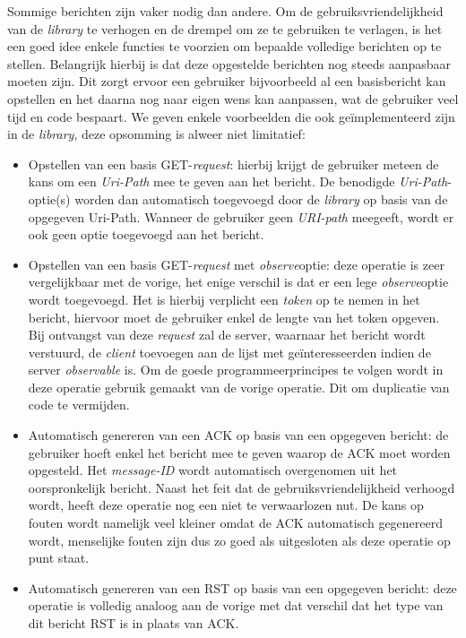Sommige berichten zijn vaker nodig dan andere. Om de gebruiksvriendelijkheid van de \textit{library} te verhogen en de drempel om ze te gebruiken te verlagen, is het een goed idee enkele functies te voorzien om bepaalde volledige berichten op te stellen. Belangrijk hierbij is dat deze opgestelde berichten nog steeds aanpasbaar moeten zijn. Dit zorgt ervoor een gebruiker bijvoorbeeld al een basisbericht kan opstellen en het daarna nog naar eigen wens kan aanpassen, wat de gebruiker veel tijd en code bespaart. We geven enkele voorbeelden die ook ge\"{i}mplementeerd zijn in de \textit{library}, deze opsomming is alweer niet limitatief:
\begin{itemize}
\item Opstellen van een basis GET-\textit{request}: hierbij krijgt de gebruiker meteen de kans om een \textit{Uri-Path} mee te geven aan het bericht. De benodigde \textit{Uri-Path}-optie(s) worden dan automatisch toegevoegd door de \textit{library} op basis van de opgegeven Uri-Path. Wanneer de gebruiker geen \textit{URI-path} meegeeft, wordt er ook geen optie toegevoegd aan het bericht.
\item Opstellen van een basis GET-\textit{request} met \textit{observe}optie: deze operatie is zeer vergelijkbaar met de vorige, het enige verschil is dat er een lege \textit{observe}optie wordt toegevoegd. Het is hierbij verplicht een \textit{token} op te nemen in het bericht, hiervoor moet de gebruiker enkel de lengte van het token opgeven. Bij ontvangst van deze \textit{request} zal de server, waarnaar het bericht wordt verstuurd, de \textit{client} toevoegen aan de lijst met ge\"{i}nteresseerden indien de server \textit{observable} is. Om de goede programmeerprincipes te volgen wordt in deze operatie gebruik gemaakt van de vorige operatie. Dit om duplicatie van code te vermijden.
\item Automatisch genereren van een ACK op basis van een opgegeven bericht: de gebruiker hoeft enkel het bericht mee te geven waarop de ACK moet worden opgesteld. Het \textit{message-ID} wordt automatisch overgenomen uit het oorspronkelijk bericht. Naast het feit dat de gebruiksvriendelijkheid verhoogd wordt, heeft deze operatie nog een niet te verwaarlozen nut. De kans op fouten wordt namelijk veel kleiner omdat de ACK automatisch gegenereerd wordt, menselijke fouten zijn dus zo goed als uitgesloten als deze operatie op punt staat.
\item Automatisch genereren van een RST op basis van een opgegeven bericht: deze operatie is volledig analoog aan de vorige met dat verschil dat het type van dit bericht RST is in plaats van ACK.
\end{itemize}


